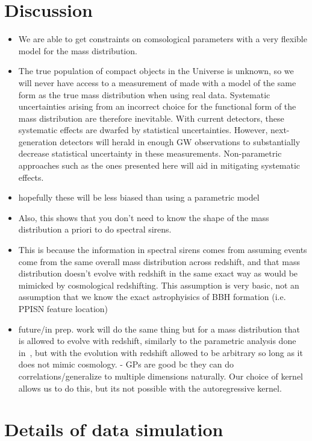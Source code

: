 \documentclass[]{aastex631}
\begin{document}
\section{Discussion}
\label{sec:discussion}


\begin{itemize}
    \item We are able to get constraints on comsological parameters with a very flexible model for the mass distribution. 
    \item The true population of compact objects in the Universe is unknown, so we will never have access to a measurement of \Ho{} made with a model of the same form as the true mass distribution when using real data.
Systematic uncertainties arising from an incorrect choice for the functional form of the mass distribution are therefore inevitable.
With current detectors, these systematic effects are dwarfed by statistical uncertainties.
However, next-generation detectors will herald in enough GW observations to substantially decrease statistical uncertainty in these measurements.
Non-parametric approaches such as the ones presented here will aid in mitigating systematic effects.
    \item hopefully these will be less biased than using a parametric model
    \item Also, this shows that you don't need to know the shape of the mass distribution a priori to do spectral sirens.
    \item This is because the information in spectral sirens comes from assuming events come from the same overall mass distribution across redshift, and that mass distribution doesn't evolve with redshift in the same exact way as would be mimicked by cosmological redshifting. This assumption is very basic, not an assumption that we know the exact astrophyisics of BBH formation (i.e. PPISN feature location)
    \item future/in prep. work will do the same thing but for a mass distribution that is allowed to evolve with redshift, similarly to the parametric analysis done in~\cite{ezquiaga_spectral_2022}, but with the evolution with redshift allowed to be arbitrary so long as it does not mimic cosmology. - GPs are good bc they can do correlations/generalize to multiple dimensions naturally. Our choice of kernel allows us to do this, but its not possible with the autoregressive kernel.
\end{itemize}


\appendix
\section{Details of data simulation}
\end{document}
